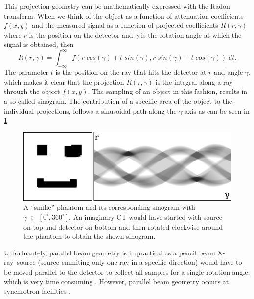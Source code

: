 \documentclass[10pt,journal,compsoc]{IEEEtran}
\newcommand{\xray}{X-ray~}
\begin{document}
This projection geometry can be mathematically expressed with the Radon transform.
When we think of the object as a function of attenuation coefficients $f(x,y)$ and the measured signal as a function of projected coefficients $R(r,\gamma)$ where $r$ is the position on the detector and $\gamma$ is the rotation angle at which the signal is obtained, then
\begin{equation}
\label{eq:radon}
R(r,\gamma) = \int_{-\infty}^{\infty} f(r\;cos(\gamma) + t\;sin(\gamma), r\;sin(\gamma)-t\;cos(\gamma))\;dt.
\end{equation} 
The parameter $t$ is the position on the ray that hits the detector at $r$ and angle $\gamma$, which makes it clear that the projection $R(r,\gamma)$ is the integral along a ray through the object $f(x,y)$.
The sampling of an object in this fashion, results in a so called sinogram.
The contribution of a specific area of the object to the individual projections, follows a sinusoidal path along the $\gamma$-axis as can be seen in \cref{fig:sinogram_parallel}
%
\begin{figure}[!h]
\centering
\includegraphics[width=\linewidth]{img/phantomandradondarker.png}
\caption{
A \enquote{smilie} phantom and its corresponding sinogram with $\gamma~\in~[0^\circ,360^\circ]$.
An imaginary CT would have started with source on top and detector on bottom and then rotated clockwise around the phantom to obtain the shown sinogram.
}
\label{fig:sinogram_parallel}
\end{figure}
%

Unfortuantely, parallel beam geometry is impractical as a pencil beam \xray source (source emmiting only one ray in a specific direction) would have to be moved parallel to the detector to collect all samples for a single rotation angle, which is very time consuming \cite{Buzug2008_chap7}.
However, parallel beam geometry occurs at synchrotron facilities \cite{something}.
\end{document}

